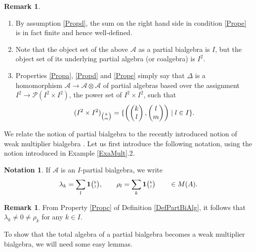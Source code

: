 \documentclass[10pt]{article}
\newcommand{\Grt}[3]{#1{\tiny {\begin{pmatrix} #2\\#3\end{pmatrix}}}}
\newcommand{\UnitC}[2]{\Grt{\mathbf{1}}{#1}{#2}}
\theoremstyle{definition}
\newtheorem{Rem}[Theorem]{Remark}
\newtheorem{Not}[Theorem]{Notation}
\numberwithin{equation}{section}
\begin{document}
\begin{Rem}\begin{enumerate}
\item By assumption \ref{Propd}, the sum on the right hand side in condition \ref{Prope} is in fact finite and hence well-defined. 
\item Note that the object set of the above $\mathscr{A}$ as a partial bialgebra is $I$, but the object set of its underlying partial algebra (or coalgebra) is $I^2$.
\item Properties \ref{Propa}, \ref{Propd} and \ref{Prope} simply say that $\Delta$ is a homomorphism $\mathscr{A}\rightarrow \mathscr{A}\otimes \mathscr{A}$ of partial algebras based over the assignment $I^2\rightarrow \mathscr{P}(I^2\times I^2)$, the power set of $I^2\times I^2$, such that \[(I^2\times I^2)_{{\tiny \begin{pmatrix} k\\m \end{pmatrix}}} = \{\left(\begin{pmatrix} k \\ l \end{pmatrix},\begin{pmatrix} l \\ m \end{pmatrix}\right)\mid l\in I\}.\] 
\end{enumerate}
\end{Rem}

We relate the notion of partial bialgebra to the recently introduced notion of weak multiplier bialgebra \cite{Boh1}. Let us first introduce the following notation, using the notion introduced in Example \ref{ExaMult}.2.

\begin{Not}
If $\mathscr{A}$ is an $I$-partial bialgebra, we write \[\lambda_k = \sum_l \UnitC{k}{l},\qquad \rho_l = \sum_k\UnitC{k}{l} \qquad \in M(A).\]
\end{Not}

\begin{Rem} From Property \ref{Propc} of Definition \ref{DefPartBiAlg}, it follows that $\lambda_k\neq 0\neq \rho_k$ for any $k\in I$. 
\end{Rem} 

To show that the total algebra of a partial bialgebra becomes a weak multiplier bialgebra, we will need some easy lemmas. 
\end{document}
